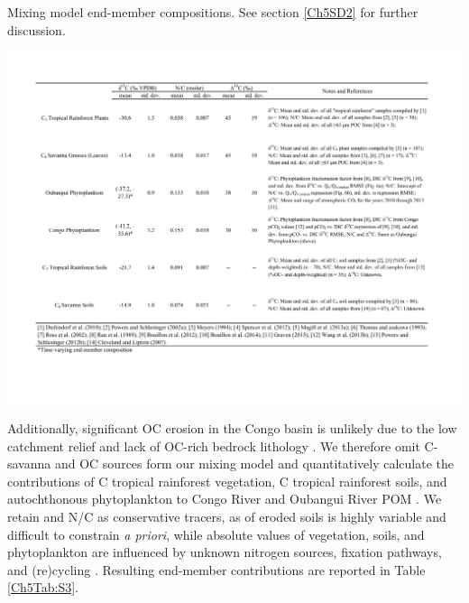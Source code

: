 \begin{table}
	\caption[Mixing model end-member compositions]{Mixing model end-member compositions. See section \ref{Ch5SD2} for further discussion.}
	\centering
		\includegraphics{Thesis_Tables/Ch5Tab3}
	\label{Ch5Tab:3} 
\end{table}

Additionally, significant OC erosion in the Congo basin is unlikely due to the low catchment relief and lack of OC-rich bedrock lithology \citep{Copard:2007bf,Milliman:2011ug}. We therefore omit C-savanna and OC sources form our mixing model and quantitatively calculate the contributions of C tropical rainforest vegetation, C tropical rainforest soils, and autochthonous phytoplankton to Congo River \citep[][this study]{Spencer:2016ho} and Oubangui River POM \citep{Bouillon:2012cw,Bouillon:2014ko}. We retain  and N/C as conservative tracers, as  of eroded soils is highly variable and difficult to constrain \textit{a priori}, while absolute  values of vegetation, soils, and phytoplankton are influenced by unknown nitrogen sources, fixation pathways, and (re)cycling \citep{Martinelli:1999ta,Kendall:2001bs}. Resulting end-member contributions are reported in Table \ref{Ch5Tab:S3}. 

